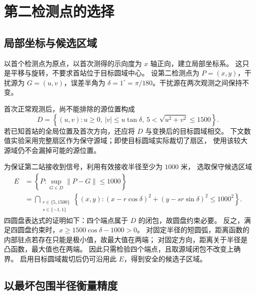 \providecommand{\qtwopath}{}


\section{第二检测点的选择}
\subsection{局部坐标与候选区域}

以首个检测点为原点，以首次测得的示向度为 $x$ 轴正向，建立局部坐标系。
这只是平移与旋转，不要求首站位于目标圆域中心。
设第二检测点为 $P=(x,y)$，干扰源为 $G=(u,v)$，误差半角为
$\delta=1^\circ=\pi/180$。干扰源在两次观测之间保持不变。

首次正常观测后，尚不能排除的源位置构成
\begin{equation}
D=\left\{(u,v):u\ge0,\ |v|\le u\tan\delta,\
5<\sqrt{u^2+v^2}\le1500\right\}.
\label{eq:q2D}
\end{equation}
若已知首站的全局位置及首次方向，还应将 $D$ 与变换后的目标圆域相交。
下文数值实验采用完整扇区作为保守源域；即使目标圆域实际裁切了扇区，
使用该较大源域仍不会漏掉可能的源位置。

为保证第二站接收到信号，利用有效接收半径至少为 $1000$ 米，
选取保守候选区域
\begin{equation}
\begin{aligned}
E&=\left\{P:\sup_{G\in D}\|P-G\|\le1000\right\}\\
&=\bigcap_{\substack{r\in\{5,1500\}\\s\in\{-1,1\}}}
\left\{(x,y):(x-r\cos\delta)^2+(y-sr\sin\delta)^2\le1000^2\right\}.
\end{aligned}
\label{eq:q2E}
\end{equation}
四圆盘表达式的证明如下：四个端点属于 $D$ 的闭包，故圆盘约束必要。
反之，满足四圆盘约束时，$x\ge1500\cos\delta-1000>0$。
对固定半径的短圆弧，距离函数的内部驻点若存在只能是极小值，故最大值在两端；
对固定方向，距离关于半径是凸函数，最大值也在两端。
因此只需检验四个端点，且取源域闭包不改变上确界。
启用目标圆域裁切后仍可沿用此 $E$，得到安全的候选子区域。

\subsection{以最坏包围半径衡量精度}

